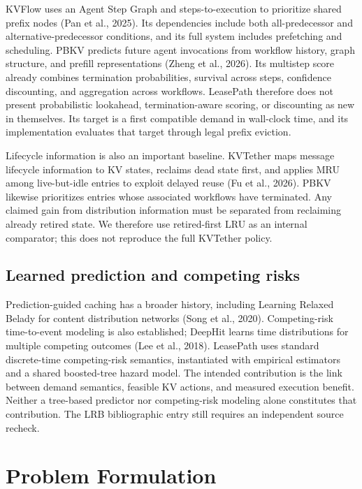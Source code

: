 \documentclass[sigconf, screen, review]{acmart}
\begin{document}
KVFlow uses an Agent Step Graph and steps-to-execution to prioritize
shared prefix nodes (Pan et al., 2025). Its dependencies include both
all-predecessor and alternative-predecessor conditions, and its full
system includes prefetching and scheduling. PBKV predicts future agent
invocations from workflow history, graph structure, and prefill
representations (Zheng et al., 2026). Its multistep score already
combines termination probabilities, survival across steps, confidence
discounting, and aggregation across workflows. LeasePath therefore does
not present probabilistic lookahead, termination-aware scoring, or
discounting as new in themselves. Its target is a first compatible
demand in wall-clock time, and its implementation evaluates that target
through legal prefix eviction.

Lifecycle information is also an important baseline. KVTether maps
message lifecycle information to KV states, reclaims dead state first,
and applies MRU among live-but-idle entries to exploit delayed reuse (Fu
et al., 2026). PBKV likewise prioritizes entries whose associated
workflows have terminated. Any claimed gain from distribution
information must be separated from reclaiming already retired state. We
therefore use retired-first LRU as an internal comparator; this does not
reproduce the full KVTether policy.

\subsection{Learned prediction and competing
risks}\label{learned-prediction-and-competing-risks}

Prediction-guided caching has a broader history, including Learning
Relaxed Belady for content distribution networks (Song et al., 2020).
Competing-risk time-to-event modeling is also established; DeepHit
learns time distributions for multiple competing outcomes (Lee et al.,
2018). LeasePath uses standard discrete-time competing-risk semantics,
instantiated with empirical estimators and a shared boosted-tree hazard
model. The intended contribution is the link between demand semantics,
feasible KV actions, and measured execution benefit. Neither a
tree-based predictor nor competing-risk modeling alone constitutes that
contribution. The LRB bibliographic entry still requires an independent
source recheck.

\section{Problem Formulation}\label{problem-formulation}
\end{document}
